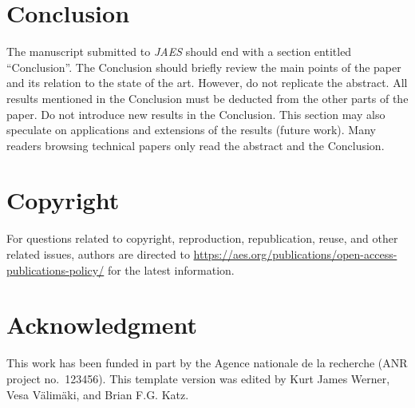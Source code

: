 \documentclass[fleqn]{jaes}
\begin{document}
\section{Conclusion}\label{sec:conc}
The manuscript submitted to \emph{JAES} should end with a section entitled ``Conclusion''. The Conclusion should briefly review the main points of the paper and its relation to the state of the art. However, do not replicate the abstract. All results mentioned in the Conclusion must be deducted from the other parts of the paper. Do not introduce new results in the Conclusion. This section may also speculate on applications and extensions of the results (future work). Many readers browsing technical papers only read the abstract and the Conclusion.

\section{Copyright}\label{sec:Copyright}

For questions related to copyright, reproduction, republication, reuse, and other related issues, authors are directed to \url{https://aes.org/publications/open-access-publications-policy/} for the latest information. 

\section{Acknowledgment}
This  work  has  been  funded  in  part  by  the Agence nationale de la recherche (ANR project no.~123456). This template version was edited by Kurt James Werner, Vesa V\"alim\"aki, and Brian F.G. Katz. 





\end{document}
